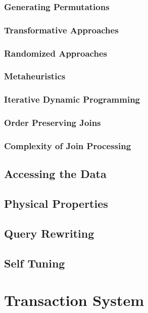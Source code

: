 \documentclass[11pt]{article}
\begin{document}
\subsubsection{Generating Permutations}
\label{sec:org448cd5c}
\subsubsection{Transformative Approaches}
\label{sec:orgb387da3}
\subsubsection{Randomized Approaches}
\label{sec:org05df034}
\subsubsection{Metaheuristics}
\label{sec:org0529e50}
\subsubsection{Iterative Dynamic Programming}
\label{sec:orgfce4cb7}
\subsubsection{Order Preserving Joins}
\label{sec:org759a9ce}
\subsubsection{Complexity of Join Processing}
\label{sec:org145ea07}
\subsection{Accessing the Data}
\label{sec:org8fc883b}

\subsection{Physical Properties}
\label{sec:org1372730}

\subsection{Query Rewriting}
\label{sec:orge5173a7}

\subsection{Self Tuning}
\label{sec:orgedcd106}
\section{Transaction System}
\label{sec:org07af306}
\end{document}

